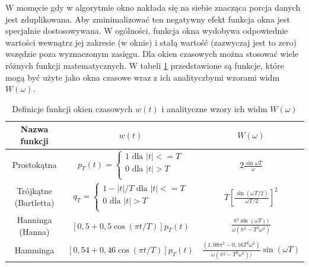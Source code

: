 \documentclass[12pt,a4paper,twoside]{mwart}
\begin{document}
W momęcie gdy w algorytmie okno nakłada się na siebie znacząca porcja danych jest zduplikowana. Aby zminimalizować ten negatywny efekt funkcja okna jest specjalnie dostosowywana. W ogólności, funkcja okna wydobywa odpowiednie wartości wewnątrz jej zakresie (w oknie) i stałą wartość (zazwyczaj jest to zero) wszędzie poza wyznaczonym zasięgu. Dla okien czasowych można stosować wiele różnych funkcji matematycznych. W tabeli \ref{tab:definicjeOkien} przedstawione są funkcje, które mogą być użyte jako okna czasowe wraz z ich analityczbymi wzorami widm $W(\omega)$\cite[103, 106]{CyfrowePrzetwarzanieSygnalowOdTeoriiDoZastosowan}\cite{RobustMethodOfMeasurmentOfFundamentalFq}.
\begin{table}[H]
  \begin{center}
    \begin{tabular}{ |c|c|c| } 
    \hline
    Nazwa funkcji & $w(t)$ & $W(\omega)$\\
    \hline
    Prostokątna & $p_T (t) = \left\{
      \begin{array}{ll}
        1 \text{ dla } |t| <= T\\
        0 \text{ dla } |t| > T\\
      \end{array}
    \right.  $ & $2\frac{\sin \omega T}{\omega}$\\
    \hline
    Trójkątne (Bartletta) & $q_T = \left\{
      \begin{array}{ll}
        1-|t|/T \text{ dla } |t| <= T\\
        0 \text{ dla } |t| > T\\
      \end{array}
    \right. $ & $T[\frac{\sin(\omega T / 2)}{\omega T/2}]^2$\\
    \hline
    Hanninga (Hanna) & $[0,5 + 0,5 \cos(\pi t / T)]p_T (t)$ & 
    $\frac{\pi^2 \sin(\omega T))}{\omega(\pi^2 - T^2 \omega^2)}$\\
    \hline
    Hamminga & $[0,54 + 0,46\cos(\pi t/T)]p_T (t)$ & 
    $\frac{(1,08\pi^2 - 0,16T^2\omega^2)}{\omega(\pi^2 - T^2 \omega^2))}\sin(\omega T)$\\
    \hline
    \end{tabular}
  \end{center}
  \caption{Definicje funkcji okien czasowych $w(t)$ i analityczne wzory ich widm $W(\omega)$}
  \label{tab:definicjeOkien}
\end{table}
\end{document}
